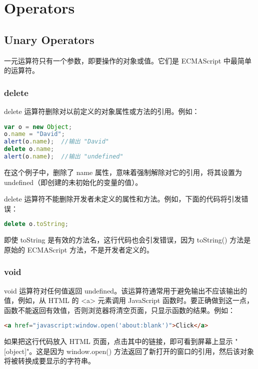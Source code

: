 \part{Operators}




\chapter{Unary Operators}


一元运算符只有一个参数，即要操作的对象或值。它们是 ECMAScript 中最简单的运算符。

\section{delete}

delete 运算符删除对以前定义的对象属性或方法的引用。例如：

\begin{lstlisting}[language=JavaScript]
var o = new Object;
o.name = "David";
alert(o.name);	//输出 "David"
delete o.name;
alert(o.name);	//输出 "undefined"
\end{lstlisting}

在这个例子中，删除了 name 属性，意味着强制解除对它的引用，将其设置为 undefined（即创建的未初始化的变量的值）。

delete 运算符不能删除开发者未定义的属性和方法。例如，下面的代码将引发错误：


\begin{lstlisting}[language=JavaScript]
delete o.toString;
\end{lstlisting}


即使 toString 是有效的方法名，这行代码也会引发错误，因为 toString() 方法是原始的 ECMAScript 方法，不是开发者定义的。

\section{void}


void 运算符对任何值返回 undefined。该运算符通常用于避免输出不应该输出的值，例如，从 HTML 的 <a> 元素调用 JavaScript 函数时。要正确做到这一点，函数不能返回有效值，否则浏览器将清空页面，只显示函数的结果。例如：


\begin{lstlisting}[language=HTML]
<a href="javascript:window.open('about:blank')">Click</a>
\end{lstlisting}

如果把这行代码放入 HTML 页面，点击其中的链接，即可看到屏幕上显示 "[object]"。这是因为 window.open() 方法返回了新打开的窗口的引用，然后该对象将被转换成要显示的字符串。

